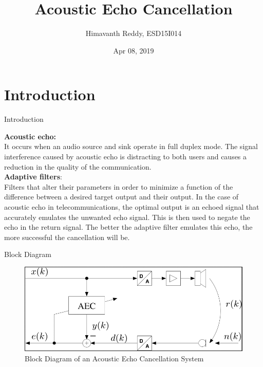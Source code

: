 \documentclass[xcolor=dvipsnames]{beamer}
\title[ITC]{Acoustic Echo Cancellation}
\author[]{Himavanth Reddy, ESD15I014}
\institute{Indian Institute of Information Technology,\\ Design and Manufacturing, Kancheepuram}
\date[Apr. 08, 2019]{Apr 08, 2019}
\begin{document}

\begin{frame}[plain,label=intro,noframenumbering]
  \titlepage
\end{frame}


\section{Introduction}

\begin{frame}{Introduction}

\textbf{Acoustic echo:}\\  It occurs when an audio source and sink operate in full duplex mode. The signal interference caused by acoustic echo is distracting to both users and causes a reduction in the quality of the communication.\newline \\
\textbf{Adaptive filters}:\\ Filters that alter their parameters in order to minimize a function of the difference between a desired target output and their output. In the case of acoustic echo in telecommunications, the optimal output is an echoed signal that accurately emulates the unwanted echo signal. This is then used to negate the echo in the return signal. The better the adaptive filter emulates this echo, the more successful the cancellation will be.

\end{frame}

\begin{frame}{Block Diagram}
	\begin{figure}
		\includegraphics[width=\textwidth]{AEC_Block_Diagram}
		\caption{Block Diagram of an Acoustic Echo Cancellation System}
	\end{figure}
\end{frame}
\end{document}
